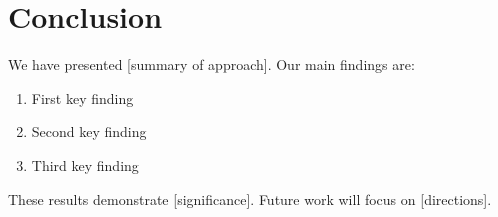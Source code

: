 \section{Conclusion}
\label{sec:conclusion}


We have presented [summary of approach].
Our main findings are:
\begin{enumerate}
    \item First key finding
    \item Second key finding
    \item Third key finding
\end{enumerate}

These results demonstrate [significance].
Future work will focus on [directions].
